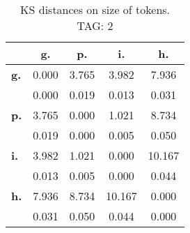 \begin{table}[h!]
\begin{center}
\begin{tabular}{| l || c | c | c | c |}\hline
 & {\bf g.} & {\bf p.} & {\bf i.} & {\bf h.} \\\hline\hline
{\bf g.} & 0.000 & 3.765 & 3.982 & 7.936 \\
{\bf } & 0.000 & 0.019 & 0.013 & 0.031 \\\hline
{\bf p.} & 3.765 & 0.000 & 1.021 & 8.734 \\
{\bf } & 0.019 & 0.000 & 0.005 & 0.050 \\\hline
{\bf i.} & 3.982 & 1.021 & 0.000 & 10.167 \\
{\bf } & 0.013 & 0.005 & 0.000 & 0.044 \\\hline
{\bf h.} & 7.936 & 8.734 & 10.167 & 0.000 \\
{\bf } & 0.031 & 0.050 & 0.044 & 0.000 \\\hline
\end{tabular}
\caption{KS distances on size of tokens. TAG: 2}
\end{center}
\end{table}